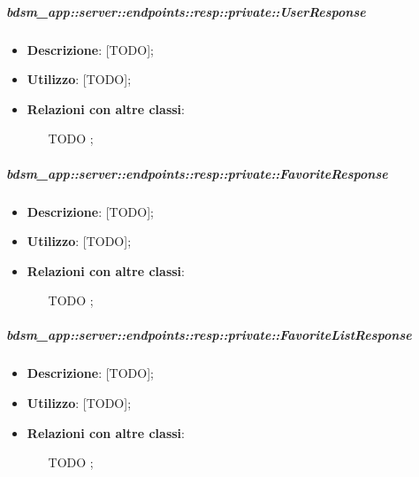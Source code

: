     \subparagraph{bdsm\_app::server::endpoints::resp::private::UserResponse} %
    \label{subp:bdsm_app_server_endpoints_resp_private_userresponse}
    \begin{itemize}
      \item \textbf{Descrizione}: [TODO];
      \item \textbf{Utilizzo}: [TODO];
      \item \textbf{Relazioni con altre classi}:
        \begin{itemize}
          \item [TODO];
        \end{itemize}
      \end{itemize}
    
    \subparagraph{bdsm\_app::server::endpoints::resp::private::FavoriteResponse} %
    \label{subp:bdsm_app_server_endpoints_resp_private_favoriteresponse}
    \begin{itemize}
      \item \textbf{Descrizione}: [TODO];
      \item \textbf{Utilizzo}: [TODO];
      \item \textbf{Relazioni con altre classi}:
        \begin{itemize}
          \item [TODO];
        \end{itemize}
      \end{itemize}
    
    \subparagraph{bdsm\_app::server::endpoints::resp::private::FavoriteListResponse} %
    \label{subp:bdsm_app_server_endpoints_resp_private_favoritelistresponse}
    \begin{itemize}
      \item \textbf{Descrizione}: [TODO];
      \item \textbf{Utilizzo}: [TODO];
      \item \textbf{Relazioni con altre classi}:
        \begin{itemize}
          \item [TODO];
        \end{itemize}
      \end{itemize}
